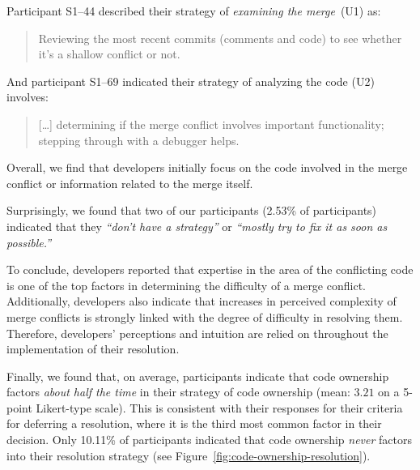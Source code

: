 Participant S1--44 described their strategy of \textit{examining the merge}~(U1) as:
\begin{quotation}
	Reviewing the most recent commits (comments and code) to see whether it's a shallow conflict or not.
\end{quotation}
	And participant S1--69 indicated their strategy of analyzing the code (U2) involves:
\begin{quotation}
[\ldots] determining if the merge conflict involves important functionality; stepping through with a debugger helps.
\end{quotation}
Overall, we find that developers initially focus on the code involved in the merge conflict or information related to the merge itself.

Surprisingly, we found that two of our participants (2.53\% of participants) indicated that they \textit{``don't have a strategy''} or \textit{``mostly try to fix it as soon as possible.''}


To conclude, developers reported that expertise in the area of the conflicting code is one of the top factors in determining the difficulty of a merge conflict.
Additionally, developers also indicate that increases in perceived complexity of merge conflicts is strongly linked with the degree of difficulty in resolving them.
Therefore, developers' perceptions and intuition are relied on throughout the implementation of their resolution.


Finally, we found that, on average, participants indicate that code ownership factors \textit{about half the time} in their strategy of code ownership (mean: $3.21$ on a 5-point Likert-type scale).
This is consistent with their responses for their criteria for deferring a resolution, where it is the third most common factor in their decision. 
Only 10.11\% of participants indicated that code ownership \textit{never} factors into their resolution strategy (see Figure~\ref{fig:code-ownership-resolution}).

